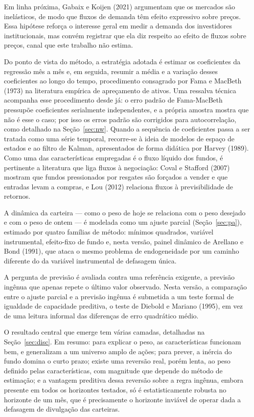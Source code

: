 \documentclass[12pt,a4paper]{article}
\begin{document}
Em linha próxima, Gabaix e Koijen (2021) argumentam que os mercados são inelásticos, de modo
que fluxos de demanda têm efeito expressivo sobre preços. Essa hipótese reforça o interesse
geral em medir a demanda dos investidores institucionais, mas convém registrar que ela diz
respeito ao efeito de fluxos sobre preços, canal que este trabalho não estima.

Do ponto de vista do método, a estratégia adotada é estimar os coeficientes da regressão mês a
mês e, em seguida, resumir a média e a variação desses coeficientes ao longo do tempo,
procedimento consagrado por Fama e MacBeth (1973) na literatura empírica de apreçamento de
ativos. Uma ressalva técnica acompanha esse procedimento desde já: o erro padrão de
Fama-MacBeth pressupõe coeficientes serialmente independentes, e a própria amostra mostra que
não é esse o caso; por isso os erros padrão são corrigidos para autocorrelação, como detalhado
na Seção~\ref{sec:nw}. Quando a sequência de coeficientes passa a ser tratada como uma série
temporal, recorre-se à ideia de modelos de espaço de estados e ao filtro de Kalman, apresentados
de forma didática por Harvey (1989). Como uma das características empregadas é o fluxo líquido
dos fundos, é pertinente a literatura que liga fluxos à negociação: Coval e Stafford (2007)
mostram que fundos pressionados por resgates são forçados a vender e que entradas levam a
compras, e Lou (2012) relaciona fluxos à previsibilidade de retornos.

A dinâmica da carteira --- como o peso de hoje se relaciona com o peso desejado e com o peso de
ontem --- é modelada como um ajuste parcial (Seção~\ref{sec:pa}), estimado por quatro famílias
de método: mínimos quadrados, variável instrumental, efeito-fixo de fundo e, nesta versão,
painel dinâmico de Arellano e Bond (1991), que ataca o mesmo problema de endogeneidade por um
caminho diferente do da variável instrumental de defasagem única.

A pergunta de previsão é avaliada contra uma referência exigente, a previsão ingênua que apenas
repete o último valor observado. Nesta versão, a comparação entre o ajuste parcial e a previsão
ingênua é submetida a um teste formal de igualdade de capacidade preditiva, o teste de
Diebold e Mariano (1995), em vez de uma leitura informal das diferenças de erro quadrático médio.

O resultado central que emerge tem várias camadas, detalhadas na Seção~\ref{sec:disc}. Em
resumo: para explicar o peso, as características funcionam bem, e generalizam a um universo
amplo de ações; para prever, a inércia do fundo domina o curto prazo; existe uma reversão real,
porém lenta, ao peso definido pelas características, com magnitude que depende do método de
estimação; e a vantagem preditiva dessa reversão sobre a regra ingênua, embora presente em
todos os horizontes testados, só é estatisticamente robusta no horizonte de um mês, que é
precisamente o horizonte inviável de operar dada a defasagem de divulgação das carteiras.
\end{document}
